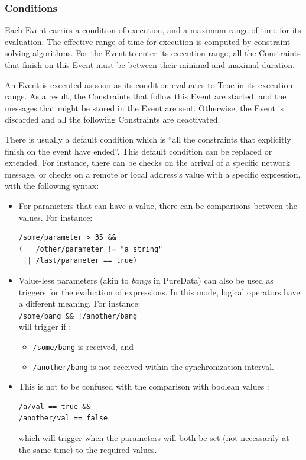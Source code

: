 \documentclass{article}
\begin{document}
	\subsubsection{Conditions}\label{Conditions}
	Each Event carries a condition of execution, and a maximum range of time for its evaluation.
	The effective range of time for execution is computed by constraint-solving algorithms. 
	For the Event to enter its execution range, all the Constraints that finish on this Event must be between their minimal and maximal duration. 
	
	An Event is executed as soon as its condition evaluates to True in its execution range. As a result, the Constraints that follow this Event are started, and the messages that might be stored in the Event are sent.
	Otherwise, the Event is discarded and all the following Constraints are deactivated.
	
	There is usually a default condition which is ``all the constraints that explicitly finish on the event have ended''.
	This default condition can be replaced or extended.
	For instance, there can be checks on the arrival of a specific network message, or checks on a remote or local address's value with a specific expression, with the following syntax:
	\begin{itemize}
	\item For parameters that can have a value, there can be comparisons between the values. For instance:
	\begin{lstlisting}[breaklines]
/some/parameter > 35 && 
(   /other/parameter != "a string" 
 || /last/parameter == true)
    \end{lstlisting}
	\item Value-less parameters (akin to \emph{bangs} in PureData) can also be used as triggers for the evaluation of expressions. In this mode, logical operators have a different meaning. For instance: \\ \texttt{/some/bang \&\& !/another/bang} \\ will trigger if : 
	\begin {itemize}
	    \item \texttt{/some/bang} is received, and 
	    \item \texttt{/another/bang} is not received within the synchronization interval. 
	\end{itemize}
	\item This is not to be confused with the comparison with boolean values : 
	\begin{lstlisting}[breaklines]
/a/val == true && 
/another/val == false
    \end{lstlisting} which will trigger when the parameters will both be set (not necessarily at the same time) to the required values.
	
	\end{itemize}
	
\end{document}

